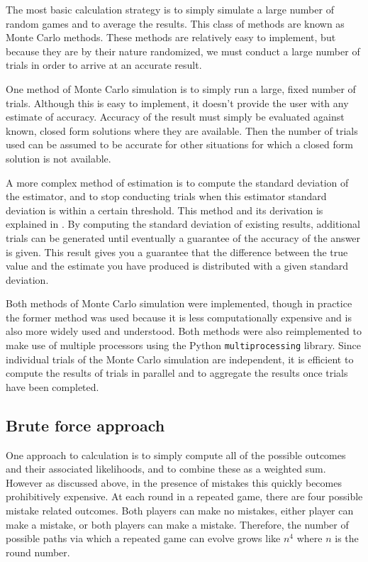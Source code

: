 \documentclass[a4paper,12pt]{article}
\begin{document}
The most basic calculation strategy is to simply simulate a large number of random games and to average the results.
This class of methods are known as Monte Carlo methods.
These methods are relatively easy to implement, but because they are by their nature randomized, we must conduct a large number of trials in order to arrive at an accurate result.

One method of Monte Carlo simulation is to simply run a large, fixed number of trials.
Although this is easy to implement, it doesn't provide the user with any estimate of accuracy.
Accuracy of the result must simply be evaluated against known, closed form solutions where they are available.
Then the number of trials used can be assumed to be accurate for other situations for which a closed form solution is not available.

A more complex method of estimation is to compute the standard deviation of the estimator, and to stop conducting trials when this estimator standard deviation is within a certain threshold.
This method and its derivation is explained in \cite{ross}.
By computing the standard deviation of existing results, additional trials can be generated until eventually a guarantee of the accuracy of the answer is given.
This result gives you a guarantee that the difference between the true value and the estimate you have produced is distributed with a given standard deviation.

Both methods of Monte Carlo simulation were implemented, though in practice the former method was used because it is less computationally expensive and is also more widely used and understood.
Both methods were also reimplemented to make use of multiple processors using the Python \texttt{multiprocessing} library.
Since individual trials of the Monte Carlo simulation are independent, it is efficient to compute the results of trials in parallel and to aggregate the results once trials have been completed.

\subsection{Brute force approach}

One approach to calculation is to simply compute all of the possible outcomes and their associated likelihoods, and to combine these as a weighted sum.
However as discussed above, in the presence of mistakes this quickly becomes prohibitively expensive.
At each round in a repeated game, there are four possible mistake related outcomes.
Both players can make no mistakes, either player can make a mistake, or both players can make a mistake.
Therefore, the number of possible paths via which a repeated game can evolve grows like $n^4$ where $n$ is the round number.
\end{document}
